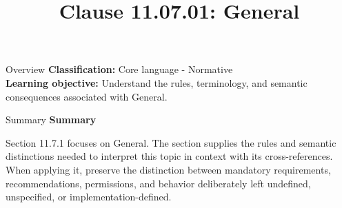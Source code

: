 \documentclass[10pt,letterpaper]{article}
\title{Clause 11.07.01: General}
\author{}
\date{}
\begin{document}
\maketitle
\begin{CornellOverviewBox}{Overview}
\textbf{Classification:} Core language - Normative\\[2pt]
\textbf{Learning objective:} Understand the rules, terminology, and semantic consequences associated with General.
\end{CornellOverviewBox}\begin{CornellSummaryBox}{Summary}
{\sffamily\bfseries\color{Accent} Summary}\par\vspace{3pt}Section 11.7.1 focuses on General. The section supplies the rules and semantic distinctions needed to interpret this topic in context with its cross-references. When applying it, preserve the distinction between mandatory requirements, recommendations, permissions, and behavior deliberately left undefined, unspecified, or implementation-defined.
\end{CornellSummaryBox}
\end{document}
